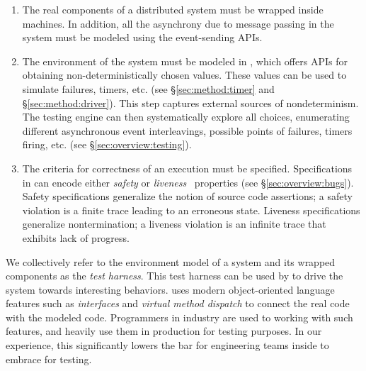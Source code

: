\begin{enumerate}
\item The real components of a distributed system must be wrapped inside \psharp machines. In addition, all the asynchrony due to message passing in the system must be modeled using the \psharp event-sending APIs. 

\item The environment of the system must be modeled in \psharp, which offers APIs for obtaining non-deterministically chosen values. These values can be used to simulate failures, timers, etc. (see \S\ref{sec:method:timer} and \S\ref{sec:method:driver}). This step captures external sources of nondeterminism. The \psharp testing engine can then systematically explore all choices, enumerating different asynchronous event interleavings, possible points of failures, timers firing, etc. (see \S\ref{sec:overview:testing}).

\item The criteria for correctness of an execution must be specified. Specifications in \psharp can encode either \emph{safety} or \emph{liveness}~\cite{lamport1977proving} properties (see \S\ref{sec:overview:bugs}). Safety specifications generalize the notion of source code assertions; a safety violation is a finite trace leading to an erroneous state. Liveness specifications generalize nontermination; a liveness violation is an infinite trace that exhibits lack of progress.

\end{enumerate}

\noindent
We collectively refer to the environment model of a system and its wrapped components as the \psharp \emph{test harness}. This test harness can be used by \psharp to drive the system towards interesting behaviors.
\psharp uses modern object-oriented language features such as \emph{interfaces} and \emph{virtual method dispatch} to connect the real code with the modeled code. Programmers in industry are used to working with such features, and heavily use them in production for testing purposes. In our experience, this significantly lowers the bar for engineering teams inside \Microsoft to embrace \psharp for testing.

